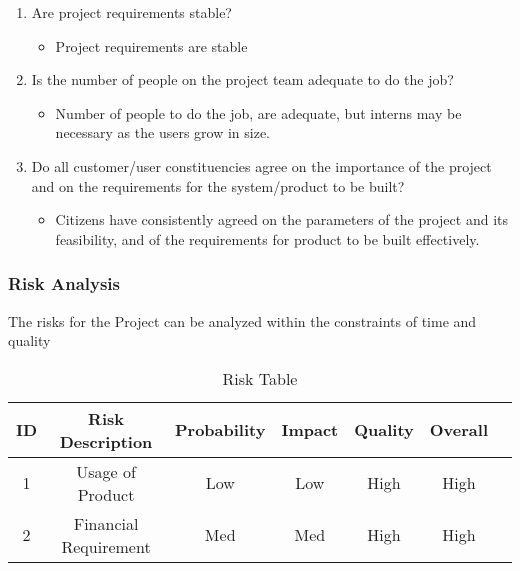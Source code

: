 \documentclass[10pt,a4paper]
{article}
\numberwithin{table}{section}
\begin{document}
{{\begin{normalsize}
\begin{enumerate}
\begin{itemize} \item  The team consists of the people with Managerial, Designing as well as Developing skill set. \end{itemize}
\item Are project requirements stable?
	\begin{itemize} \item  Project requirements are stable \end{itemize}
\item Is the number of people on the project team adequate to do the job?
\begin{itemize} \item  Number of people to do the job, are adequate, but interns may be necessary as the users grow in size. \end{itemize}
\item Do all customer/user constituencies agree on the importance of the project and on the requirements for the system/product to be built?
\begin{itemize} \item  Citizens have consistently agreed on the parameters of the project and its feasibility, and of the requirements for product to be built effectively. \end{itemize}
\end{enumerate}

\subsubsection{Risk Analysis}
\hspace*{0.3cm}The risks for the Project can be analyzed within the constraints of time and quality
\begin{table}[hbtp]
\begin{center}
\def\arraystretch{1.5}
\begin{tabular}{| c | c | c | c | c | c | c | }
\hline
{ID} & {Risk Description}	& {Probability} & {Impact} 	& {Quality}	& {Overal}l \\ \hline
1	& Usage of Product	& Low	& Low	& High	& High \\ \hline
2	& Financial Requirement	& Med	& Med	& High	& High \\ \hline
\end{tabular}
\end{center}
\caption{Risk Table}
\label{tab:risk}
\end{table}


\end{normalsize}}}
\end{document}
